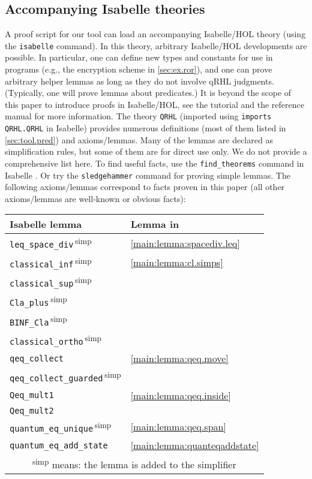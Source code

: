 \documentclass{article}
\newcommand\qrhlautorefx[1]{\autoref{main:#1}}
\begin{document}
\subsection{Accompanying Isabelle theories}
\label{sec:isabelle}

A proof script for our tool can load an accompanying Isabelle/HOL
theory (using the \texttt{isabelle} command). In this theory,
arbitrary Isabelle/HOL developments are possible.  In particular, one
can define new types and constants for use in programs (e.g., the
encryption scheme in \autoref{sec:ex.ror}), and one can prove
arbitrary helper lemmas as long as they do not involve qRHL
judgments. (Typically, one will prove lemmas about predicates.)  It is
beyond the scope of this paper to introduce proofs in Isabelle/HOL,
see the tutorial \cite{isabelle-tutorial} and the
reference manual \cite{isar-ref} for more information. The theory
\texttt{QRHL} (imported using \texttt{imports QRHL.QRHL} in Isabelle) provides numerous definitions (most of them listed in
\autoref{sec:tool.pred}) and axioms/lemmas. Many of the lemmas are
declared as simplification rules, but some of them are for direct use
only. We do not provide a comprehensive list here. To find useful
facts, use the \texttt{find\_theorems} command in Isabelle
\cite{isar-ref}. Or try the \texttt{sledgehammer} command
\cite{isar-ref} for proving simple lemmas.  The following
axioms/lemmas correspond to facts proven in this paper (all other axioms/lemmas are
well-known or obvious facts):
\begin{center}
\begin{tabular}{|ll|}
  \hline
  \bfseries Isabelle lemma
  &
    \bfseries Lemma in \cite{qrhl-paper-from-manual}
  \\
  \hline
  \hline
  \texttt{leq\_space\_div}\,\textsuperscript{simp} & \qrhlautorefx{lemma:spacediv.leq} \\
  \hline
  \texttt{classical\_inf}\,\textsuperscript{simp} & \qrhlautorefx{lemma:cl.simps} \\
  \texttt{classical\_sup}\,\textsuperscript{simp} &\\
  \texttt{Cla\_plus}\,\textsuperscript{simp} &\\
  \texttt{BINF\_Cla}\,\textsuperscript{simp} &\\
  \texttt{classical\_ortho}\,\textsuperscript{simp} &\\
  \hline
  \texttt{qeq\_collect} & \qrhlautorefx{lemma:qeq.move} \\
  \texttt{qeq\_collect\_guarded}\,\textsuperscript{simp} & \\
  \hline
  \texttt{Qeq\_mult1} & \qrhlautorefx{lemma:qeq.inside} \\
  \texttt{Qeq\_mult2} & \\
  \hline
  \texttt{quantum\_eq\_unique}\,\textsuperscript{simp} & \qrhlautorefx{lemma:qeq.span} \\
  \hline
  \texttt{quantum\_eq\_add\_state} & \qrhlautorefx{lemma:quanteqaddstate} \\
  \hline
  \hline
  \multicolumn{2}{|c|}{\textsuperscript{simp} means: the lemma is added to the simplifier} \\
  \hline
\end{tabular}
\end{center}
\end{document}
